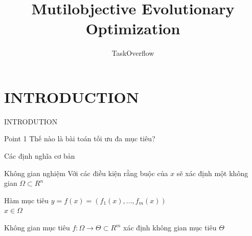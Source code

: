 \documentclass{beamer}
\title{Mutilobjective Evolutionary Optimization}
\author{TaskOverflow}
\begin{document}
    \maketitle 


    \section{INTRODUCTION}
    \begin{frame}{INTRODUTION}
        \begin{block}{Point 1}
            Thế nào là bài toán tối ưu đa mục tiêu?
        \end{block}
    \end{frame}
    
    \begin{frame}{Các định nghĩa cơ bản}
        \begin{block}{Không gian nghiệm}
            Với các điều kiện rằng buộc của $x$ sẽ xác định một không gian $\Omega \subset R^{n}$
        \end{block}
        \pause
        \begin{block}{Hàm mục tiêu}
                $y = f(x)= (f_{1}(x),...,f_{m}(x))$
                \\$ x \in \Omega $
        \end{block}
        \pause
        \begin{block}{Không gian mục tiêu}
            $f : \Omega \to \Theta  \subset R^{m}$ xác định không gian mục tiêu $\Theta$
        \end{block}
    \end{frame}
\end{document}
